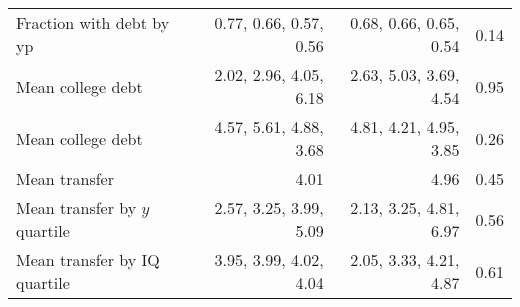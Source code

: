 \begin{tabular}{lrrr}
Fraction with debt by yp & 0.77, 0.66, 0.57, 0.56  & 0.68, 0.66, 0.65, 0.54  & 0.14  \\ 
Mean college debt & 2.02, 2.96, 4.05, 6.18  & 2.63, 5.03, 3.69, 4.54  & 0.95  \\ 
Mean college debt & 4.57, 5.61, 4.88, 3.68  & 4.81, 4.21, 4.95, 3.85  & 0.26  \\ 
Mean transfer & 4.01  & 4.96  & 0.45  \\ 
Mean transfer by $y$ quartile & 2.57, 3.25, 3.99, 5.09  & 2.13, 3.25, 4.81, 6.97  & 0.56  \\ 
Mean transfer by IQ quartile & 3.95, 3.99, 4.02, 4.04  & 2.05, 3.33, 4.21, 4.87  & 0.61  \\ 
\hline
\end{tabular}%
